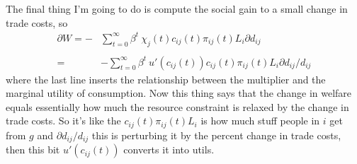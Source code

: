 \documentclass[12pt,pdftex]{article}
\begin{document}
\begin{onehalfspacing}
The final thing I'm going to do is compute the social gain to a small change in trade costs, so
\begin{align}
\partial W = - & \sum_{t=0}^{\infty} \beta^{t} \ \chi_{j}(t) c_{ij}(t) \pi_{ij}(t) L_{i} \partial d_{ij} \\
\nonumber \\
=& - \sum_{t=0}^{\infty} \beta^{t} \ u'(c_{ij}(t)) c_{ij}(t) \pi_{ij}(t) L_{i} \partial d_{ij} / d_{ij}
\end{align}
where the last line inserts the relationship between the multiplier and the marginal utility of consumption. Now this thing says that the change in welfare equals essentially how much the resource constraint is relaxed by the change in trade costs. So it's like the $c_{ij}(t) \pi_{ij}(t) L_{i}$ is how much stuff people in $i$ get from $g$ and $\partial d_{ij} / d_{ij}$ this is perturbing it by the percent change in trade costs, then this bit $u'(c_{ij}(t))$ converts it into utils.

\newpage



\end{onehalfspacing}
\end{document}

